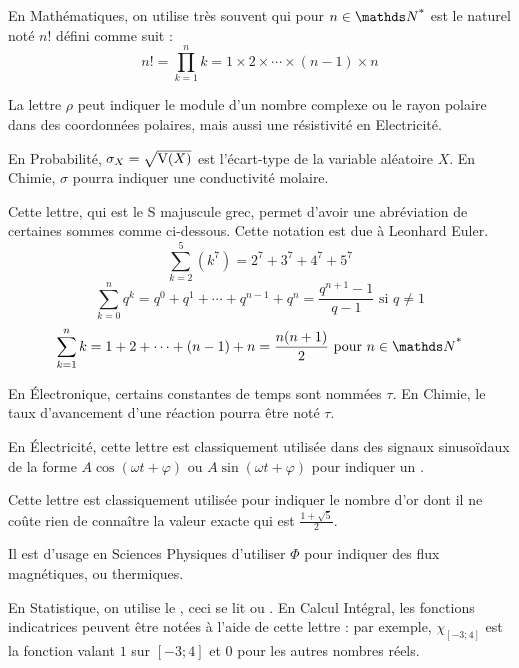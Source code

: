 \noindent En Mathématiques, on utilise très souvent  qui pour $ n \in \NN^{\text{*}}$ est le naturel noté $n!$ \label{factoriel} défini comme suit :
\begin{equation}
	n! = \prod_{k = 1}^{n} k = 1 \times 2 \times \cdots \times(n-1) \times n
\end{equation}


\cadre{$\rho$} La lettre $\rho$ peut indiquer le module d’un nombre complexe ou le rayon polaire dans des coordonnées polaires, mais aussi une résistivité en Electricité.


\cadre{$\sigma$} En Probabilité, $\sigma_X = \sqrt{\mathrm{V}(X)}$ est l'écart-type de la variable aléatoire $X$. En Chimie, $\sigma$ pourra indiquer une conductivité molaire.


\cadre{$\Sigma$} Cette lettre, qui est le S majuscule grec, permet d'avoir une abréviation de certaines sommes comme ci-dessous. Cette notation est due à Leonhard Euler.
\begin{equation}
	\sum_{k = 2}^{5} \left( k^7 \right) = 2^7 + 3^7 + 4^7 + 5^7
\end{equation}
\begin{equation}
	\sum_{k = 0}^{n} q^k = q^0 + q^1  + \cdots + q^{n-1} + q^n = \frac{q^{n+1} - 1}{q - 1} \text{ si } q \neq 1
\end{equation}
\begin{equation}
	\sum_{k = 1}^{n} k = 1 + 2 + \cdots + (n-1) + n = \frac{n (n + 1)}{2}  \text{ pour } n \in \NNs
\end{equation}


\cadre{$\tau$} En Électronique, certains constantes de temps sont nommées $\tau$. En Chimie, le taux d'avancement d'une réaction pourra être noté $\tau$.


\cadre{$\varphi$} En Électricité, cette lettre est classiquement utilisée dans des signaux sinusoïdaux de la forme $A\cos(\omega t + \varphi)$ ou $A\sin(\omega t + \varphi)$ pour indiquer un .

\cadre{$\phi$} Cette lettre est classiquement utilisée pour indiquer le nombre d'or dont il ne coûte rien de connaître la valeur exacte qui est $\frac{1 + \sqrt{5}}{2}$.


\cadre{$\Phi$} Il est d'usage en Sciences Physiques d'utiliser $\Phi$ pour indiquer des flux magnétiques, ou thermiques.


\cadre{$\chi$} En Statistique, on utilise le , ceci se lit  ou . En Calcul Intégral, les fonctions indicatrices peuvent être notées à l'aide de cette lettre : par exemple, $\chi_{[-3;4]}$ est la fonction valant $1$ sur $[-3;4]$ et $0$ pour les autres nombres réels.



